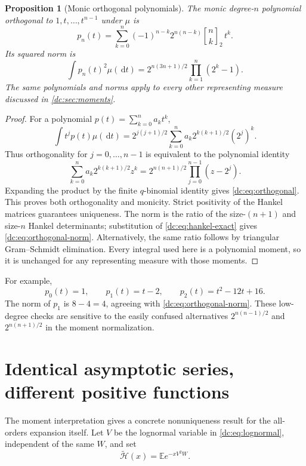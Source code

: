 \documentclass[11pt,a4paper,oneside,openany]{book}
\numberwithin{equation}{chapter}
\newtheorem{proposition}[theorem]{Proposition}
\theoremstyle{definition}
\theoremstyle{remark}
\newcommand{\E}{\mathbb E}
\newcommand{\dd}{\,\mathrm d}
\newcommand{\qbinom}[3]{\genfrac{[}{]}{0pt}{}{#1}{#2}_{#3}}
\newcommand{\calH}{\mathcal H}
\begin{document}
\begin{proposition}[Monic orthogonal polynomials]
\label{dc:prop:orthogonal}
The monic degree-$n$ polynomial orthogonal to $1,t,\ldots,t^{n-1}$
under $\mu$ is
\begin{equation}
 \boxed{\displaystyle
 p_n(t)=\sum_{k=0}^n(-1)^{n-k}2^{n(n-k)}\qbinom nk2\,t^k.}
 \label{dc:eq:orthogonal}
\end{equation}
Its squared norm is
\begin{equation}
 \int p_n(t)^2\mu(\dd t)
 =2^{n(3n+1)/2}\prod_{k=1}^n(2^k-1).
 \label{dc:eq:orthogonal-norm}
\end{equation}
The same polynomials and norms apply to every other representing
measure discussed in \cref{dc:sec:moments}.
\end{proposition}
\begin{proof}
For a polynomial $p(t)=\sum_{k=0}^na_kt^k$,
\[
 \int t^jp(t)\mu(\dd t)
 =2^{j(j+1)/2}\sum_{k=0}^n
        a_k2^{k(k+1)/2}(2^j)^k.
\]
Thus orthogonality for $j=0,\ldots,n-1$ is equivalent to the
polynomial identity
\[
 \sum_{k=0}^na_k2^{k(k+1)/2}z^k
 =2^{n(n+1)/2}\prod_{j=0}^{n-1}(z-2^j).
\]
Expanding the product by the finite $q$-binomial identity gives
\cref{dc:eq:orthogonal}. This proves both orthogonality and monicity.
Strict positivity of the Hankel matrices guarantees uniqueness.
The norm is the ratio of the size-$(n+1)$ and size-$n$ Hankel
determinants; substitution of \cref{dc:eq:hankel-exact} gives
\cref{dc:eq:orthogonal-norm}. Alternatively, the same ratio follows
by triangular Gram--Schmidt elimination. Every integral used here
is a polynomial moment, so it is unchanged for any representing
measure with those moments.
\end{proof}

For example,
\[
 p_0(t)=1,\qquad p_1(t)=t-2,\qquad
 p_2(t)=t^2-12t+16.
\]
The norm of $p_1$ is $8-4=4$, agreeing with
\cref{dc:eq:orthogonal-norm}. These low-degree checks are sensitive to
the easily confused alternatives $2^{n(n-1)/2}$ and
$2^{n(n+1)/2}$ in the moment normalization.
\chapter{Identical asymptotic series, different positive functions}
\label{dc:sec:flat-twins}
The moment interpretation gives a concrete nonuniqueness result for
the all-orders expansion itself. Let $V$ be the lognormal variable
in \cref{dc:eq:lognormal}, independent of the same $W$, and set
\begin{equation}
 \widetilde{\calH}(x)=\E e^{-xV^2W}.
 \label{dc:eq:Htilde}
\end{equation}
\end{document}

